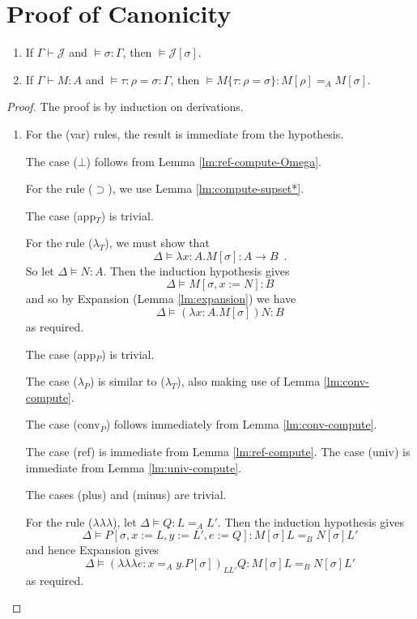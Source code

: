 \documentclass[a4paper,UKenglish]{lipics-v2016}
\newcommand*{\triplelambda}{\ensuremath{\lambda \!\! \lambda \!\! \lambda}}
\theoremstyle{plain}
\theoremstyle{definition}
\begin{document}
\section{Proof of Canonicity}

\begin{theorem}
\begin{enumerate}
\item
If $\Gamma \vdash \mathcal{J}$ and $\models \sigma : \Gamma$, then $\models \mathcal{J} [ \sigma ]$.
\item
If $\Gamma \vdash M : A$ and $\models \tau : \rho = \sigma : \Gamma$, then $\models M \{ \tau : \rho = \sigma \} : M [ \rho ] =_A M [ \sigma ]$.
\end{enumerate}
\end{theorem}

\begin{proof}
The proof is by induction on derivations.
\begin{enumerate}
\item
For the (var) rules, the result is immediate from the hypothesis.  

The case ($\bot$) follows from Lemma \ref{lm:ref-compute-Omega}.

For the rule ($\supset$), we use Lemma \ref{lm:compute-supset*}.

The case (app$_T$) is trivial.

For the rule ($\lambda_T$), we must show that
\[ \Delta \models \lambda x:A.M[\sigma] : A \rightarrow B \enspace . \]
So let $\Delta \models N : A$.  Then the induction hypothesis gives
\[ \Delta \models M[\sigma, x:=N] : B \]
and so by Expansion (Lemma \ref{lm:expansion}) we have
\[ \Delta \models (\lambda x:A.M[\sigma])N : B \]
as required.

The case (app$_P$) is trivial.

The case ($\lambda_P$) is similar to ($\lambda_T$), also making use of Lemma \ref{lm:conv-compute}.

The case (conv$_P$) follows immediately from Lemma \ref{lm:conv-compute}.

The case (ref) is immediate from Lemma \ref{lm:ref-compute}.  The case (univ) is immediate from Lemma \ref{lm:univ-compute}.

The cases (plus) and (minus) are trivial.

For the rule ($\triplelambda$), let $\Delta \models Q : L =_A L'$.  Then the induction hypothesis gives
\[ \Delta \models P [ \sigma, x := L, y := L', e := Q ] : M [\sigma] L =_B N [\sigma] L' \]
and hence Expansion gives
\[ \Delta \models (\triplelambda e:x =_A y.P [ \sigma ])_{L L'} Q : M[\sigma] L =_B N[\sigma] L' \]
as required.


\end{enumerate}
\end{proof}
\end{document}
